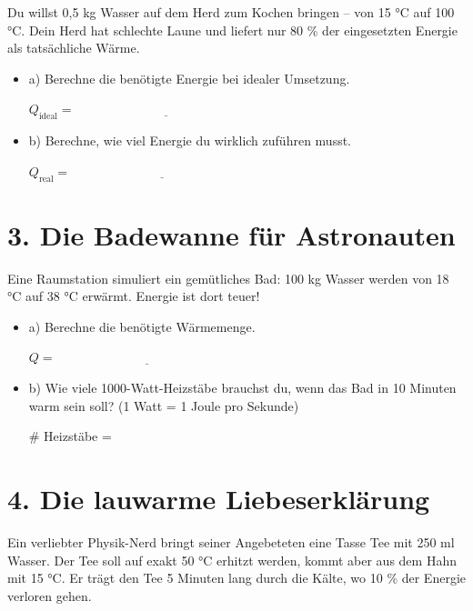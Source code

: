 \documentclass[a4paper]{article}
\begin{document}
	Du willst 0{,}5 kg Wasser auf dem Herd zum Kochen bringen – von 15 °C auf 100 °C. Dein Herd hat schlechte Laune und liefert nur 80 \% der eingesetzten Energie als tatsächliche Wärme.
	
	\begin{itemize}
		\item a) Berechne die benötigte Energie bei idealer Umsetzung.
		
		\vspace{1em}
		\( Q_\text{ideal} = \underline{\hspace{6cm}} \)
		
		\item b) Berechne, wie viel Energie du wirklich zuführen musst.
		
		\vspace{1em}
		\( Q_\text{real} = \underline{\hspace{6cm}} \)
	\end{itemize}
	
	\hrulefill
	
	\section*{3. Die Badewanne für Astronauten }
	
	Eine Raumstation simuliert ein gemütliches Bad: 100 kg Wasser werden von 18 °C auf 38 °C erwärmt. Energie ist dort teuer!
	
	\begin{itemize}
		\item a) Berechne die benötigte Wärmemenge.
		
		\vspace{1em}
		\( Q = \underline{\hspace{6cm}} \)
		
		\item b) Wie viele 1000-Watt-Heizstäbe brauchst du, wenn das Bad in 10 Minuten warm sein soll?  
		(1 Watt = 1 Joule pro Sekunde)
		
		\vspace{1em}
		\# Heizstäbe = \underline{\hspace{6cm}}
	\end{itemize}
	
	\hrulefill
	
	\section*{4. Die lauwarme Liebeserklärung }
	
	Ein verliebter Physik-Nerd bringt seiner Angebeteten eine Tasse Tee mit 250 ml Wasser. Der Tee soll auf exakt 50 °C erhitzt werden, kommt aber aus dem Hahn mit 15 °C. Er trägt den Tee 5 Minuten lang durch die Kälte, wo 10 \% der Energie verloren gehen.
	
\end{document}

